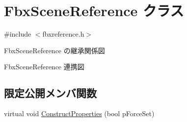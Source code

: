 \hypertarget{class_fbx_scene_reference}{}\section{Fbx\+Scene\+Reference クラス}
\label{class_fbx_scene_reference}


{\ttfamily \#include $<$fbxreference.\+h$>$}



Fbx\+Scene\+Reference の継承関係図


Fbx\+Scene\+Reference 連携図
\subsection*{限定公開メンバ関数}
\begin{DoxyCompactItemize}
\item 
virtual void \hyperlink{class_fbx_scene_reference_a93aabe2339dc932673dacb8be72eb813}{Construct\+Properties} (bool p\+Force\+Set)
\end{DoxyCompactItemize}
